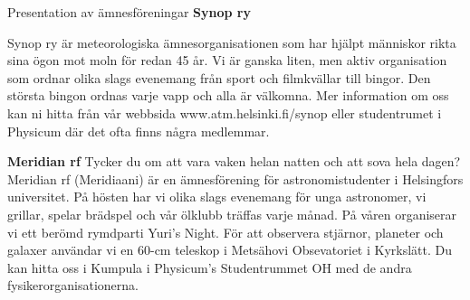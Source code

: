 \documentclass{spektraklet}
\begin{document}
\begin{artikel}{Presentation av ämnesföreningar}{}
\textbf{Synop ry}

Synop ry är meteorologiska ämnesorganisationen som har hjälpt människor rikta sina
ögon mot moln för redan 45 år. Vi är ganska liten, men aktiv organisation som ordnar olika
slags evenemang från sport och filmkvällar till bingor. Den största bingon ordnas varje vapp
och alla är välkomna. Mer information om oss kan ni hitta från vår webbsida www.atm.helsinki.fi/synop eller studentrumet i Physicum där det ofta finns några medlemmar.

\textbf{Meridian rf}
Tycker du om att vara vaken helan natten och att sova hela dagen? Meridian rf
(Meridiaani) är en ämnesförening för astronomistudenter i Helsingfors universitet. På hösten
har vi olika slags evenemang för unga astronomer, vi grillar, spelar brädspel och vår ölklubb träffas varje månad. På våren organiserar vi ett berömd rymdparti Yuri's Night. För att observera stjärnor, planeter och galaxer användar vi en 60-cm teleskop i Metsähovi
Obsevatoriet i Kyrkslätt. Du kan hitta oss i Kumpula i Physicum's Studentrummet OH med de
andra fysikerorganisationerna.
\end{artikel}
\end{document}
